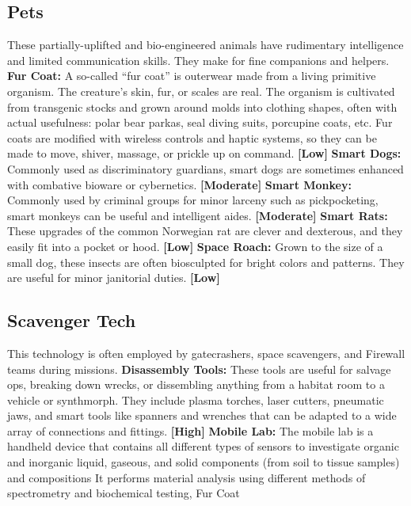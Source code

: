 \subsection{Pets}

These partially-uplifted and bio-engineered animals 
have rudimentary intelligence and limited communication
skills. They make for fine companions and helpers.
\textbf{Fur Coat:} A so-called ``fur coat'' is outerwear made 
from a living primitive organism. The creature's skin, 
fur, or scales are real. The organism is cultivated from 
transgenic stocks and grown around molds into clothing
shapes, often with actual usefulness: polar bear
parkas, seal diving suits, porcupine coats, etc. Fur 
coats are modified with wireless controls and haptic 
systems, so they can be made to move, shiver, massage, 
or prickle up on command. \textbf{[Low]}
\textbf{Smart Dogs:} Commonly used as discriminatory 
guardians, smart dogs are sometimes enhanced with 
combative bioware or cybernetics. \textbf{[Moderate]}
\textbf{Smart Monkey:} Commonly used by criminal groups 
for minor larceny such as pickpocketing, smart monkeys
can be useful and intelligent aides. \textbf{[Moderate]}
\textbf{Smart Rats:} These upgrades of the common Norwegian
rat are clever and dexterous, and they easily fit
into a pocket or hood. \textbf{[Low]}
\textbf{Space Roach:} Grown to the size of a small dog, 
these insects are often biosculpted for bright colors 
and patterns. They are useful for minor janitorial 
duties. \textbf{[Low]}

\subsection{Scavenger Tech}

This technology is often employed by gatecrashers, 
space scavengers, and Firewall teams during missions.
\textbf{Disassembly Tools:} These tools are useful for salvage
ops, breaking down wrecks, or dissembling anything
from a habitat room to a vehicle or synthmorph.
They include plasma torches, laser cutters, pneumatic 
jaws, and smart tools like spanners and wrenches that 
can be adapted to a wide array of connections and 
fittings. \textbf{[High]}
\textbf{Mobile Lab: }The mobile lab is a handheld device 
that contains all different types of sensors to investigate
organic and inorganic liquid, gaseous, and solid
components (from soil to tissue samples) and compositions
It performs material analysis using different
methods of spectrometry and biochemical testing, 
Fur Coat

